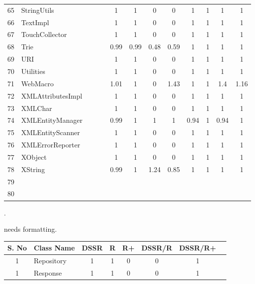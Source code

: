 \documentclass[conference]{IEEEtran}
\begin{document}
\begin{tabular}{|c|l|c|c|c|c|c|c|c|c|c|c|c|}
      65	& StringUtils		&&&	& 1		& 1		& 0		& 0		& 1		& 1		& 1		& 1	\\
      66	& TextImpl		&&&	& 1		& 1		& 0		& 0		& 1		& 1		& 1		& 1	\\
      67	& TouchCollector	&&&	& 1		& 1		& 0		& 0		& 1		& 1		& 1		& 1	\\
      68	& Trie			&&&	& 0.99	& 0.99	& 0.48	& 0.59	& 1		& 1		& 1		& 1	\\
      69	& URI			&&&	& 1		& 1		& 0		& 0		& 1		& 1		& 1		& 1	\\
      70	& Utilities			&&&	& 1		& 1		& 0		& 0		& 1		& 1		& 1		& 1	\\
      71	& WebMacro		&&&	& 1.01	& 1		& 0		& 1.43	& 1		& 1		& 1.4	& 1.16	\\
      72	& XMLAttributesImpl	&&&	& 1		& 1		& 0		& 0		& 1		& 1		& 1		& 1	\\
      73	& XMLChar		&&&	& 1		& 1		& 0		& 0		& 1		& 1		& 1		& 1	\\
      74	& XMLEntityManager&&&	& 0.99	& 1		& 1		& 1		& 0.94	& 1		& 0.94	& 1	\\
      75	& XMLEntityScanner	&&&	& 1		& 1		& 0		& 0		& 1		& 1		& 1		& 1	\\
      76	& XMLErrorReporter	&&&	& 1		& 1		& 0		& 0		& 1		& 1		& 1		& 1	\\
      77	& XObject			&&&	& 1		& 1		& 0		& 0		& 1		& 1		& 1		& 1	\\
      78	& XString			&&&	& 0.99	& 1		& 1.24	& 0.85	& 1		& 1		& 1		& 1	\\
      79	& 			&&&	& 	& 		& 	& 	& 		& 		& 		& 	\\
      80	& 			&&&	& 	& 		& 	& 	& 		& 		& 		& 	\\     
         \hline
    \end{tabular}

\newpage.





\newpage
needs formatting.
\newpage
 \scriptsize
    \begin{tabular}{|c|l|c|c|c|c|c|c|}
      \hline
     				S. No	&	Class Name	&	DSSR	&	R 	&  R+ 	&	DSSR/R 	& 	DSSR/R+	\\
	 \hline
      
      				1		& Repository			& 1		& 1		&  0		& 0		& 1	\\
     				1		& Response			& 1		& 1		&  0		& 0		& 1	\\
         
         
         
         
         
         
         
         
         
         
         
         
         
         
         
         
         
         \hline
    \end{tabular}
\end{document}
